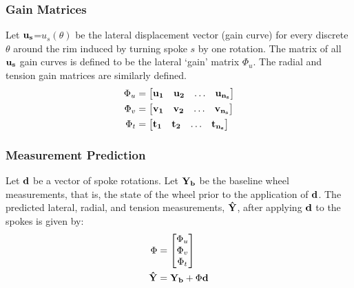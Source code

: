 \documentclass[mathserif]{beamer}
\begin{document}
\begin{frame}
\frametitle{Gain Matrices}
Let $\bf{u_s}$=$u_s(\theta)$ be the lateral displacement vector (gain curve) for every discrete $\theta$ around the rim induced by turning spoke $s$ by one rotation.  The matrix of all $\bf u_s$ gain curves is defined to be the lateral `gain' matrix $\Phi_u$.  The radial and tension gain matrices are similarly defined.
\begin{align*}
     \Phi_u &= \begin{bmatrix}
     \bf u_1 & \bf u_2& \dots & \bf u_{n_s}
     \end{bmatrix}\\
     \Phi_v &= \begin{bmatrix}
     \bf v_1 & \bf v_2& \dots & \bf v_{n_s}
     \end{bmatrix}\\     
     \Phi_t &= \begin{bmatrix}
     \bf t_1 & \bf t_2& \dots & \bf t_{n_s}
     \end{bmatrix} 
     \end{align*}
\end{frame}

\begin{frame}
\frametitle{Measurement Prediction}
Let $\bf d$ be a vector of spoke rotations. Let $\bf Y_b$ be the baseline wheel measurements, that is, the state of the wheel prior to the application of $\bf d$. The predicted lateral, radial, and tension measurements, $\bf \hat Y$, after applying $\bf d$ to the spokes is given by:
\begin{align*}
    \Phi &= \begin{bmatrix}
        \Phi_u\\
        \Phi_v\\
        \Phi_t
    \end{bmatrix}\\
   \bf \hat Y&= {\bf Y_b} + \Phi \bf d\\
\end{align*}
\end{frame}
\end{document}
